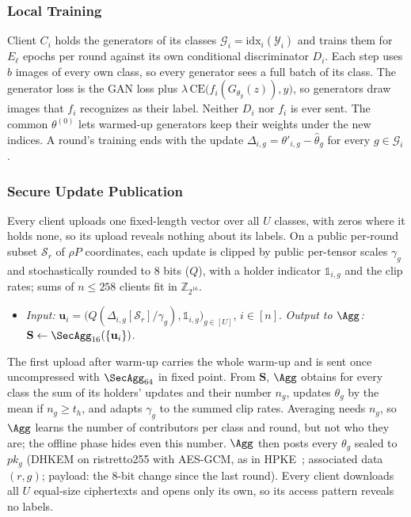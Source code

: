 \subsubsection{Local Training}
\label{sec:rounds}
Client $C_i$ holds the generators of its classes $\mathcal{G}_i=\mathrm{idx}_i(\mathcal{Y}_i)$ and
trains them for $E_\ell$ epochs per round against its own conditional discriminator $D_i$. Each step
uses $b$ images of every own class, so every generator sees a full batch of its class. The generator
loss is the GAN loss plus $\lambda\,\mathrm{CE}\big(f_i(G_{\theta_g}(z)),y\big)$, so generators draw
images that $f_i$ recognizes as their label. Neither $D_i$ nor $f_i$ is ever sent. The common
$\theta^{(0)}$ lets warmed-up generators keep their weights under the new indices. A round's
training ends with the update $\Delta_{i,g}=\theta'_{i,g}-\hat\theta_g$ for every
$g\in\mathcal{G}_i$.

\subsubsection{Secure Update Publication}
\label{sec:publish}
Every client uploads one fixed-length vector over all $U$ classes, with zeros where it holds none,
so its upload reveals nothing about its labels. On a public per-round subset $\mathcal{S}_r$ of
$\rho P$ coordinates, each update is clipped by public per-tensor scales $\gamma_g$ and
stochastically rounded to 8 bits ($Q$), with a holder indicator $\mathbb{1}_{i,g}$ and the clip
rates; sums of $n\le258$ clients fit in $\mathbb{Z}_{2^{16}}$.
\begin{itemize}
  \item \emph{Input:} $\mathbf{u}_i=\big(Q(\Delta_{i,g}[\mathcal{S}_r]/\gamma_g),\mathbb{1}_{i,g}\big)_{g\in[U]}$, $i\in[n]$.
  \emph{Output to $\Agg$:} $\mathbf{S}\gets\SecAgg_{16}(\{\mathbf{u}_i\})$.
\end{itemize}
The first upload after warm-up carries the whole warm-up and is sent once uncompressed with
$\SecAgg_{64}$ in fixed point. From $\mathbf{S}$, $\Agg$ obtains for every class the sum of its
holders' updates and their number $n_g$, updates $\theta_g$ by the mean if $n_g\ge t_h$, and adapts
$\gamma_g$ to the summed clip rates. Averaging needs $n_g$, so $\Agg$ learns the number of
contributors per class and round, but not who they are; the offline phase hides even this number.
$\Agg$ then posts every $\theta_g$ sealed to $pk_g$ (DHKEM on ristretto255 with AES-GCM, as in
HPKE~\cite{rfc9180}; associated data $(r,g)$; payload: the 8-bit change since the last round). Every
client downloads all $U$ equal-size ciphertexts and opens only its own, so its access pattern
reveals no labels.


